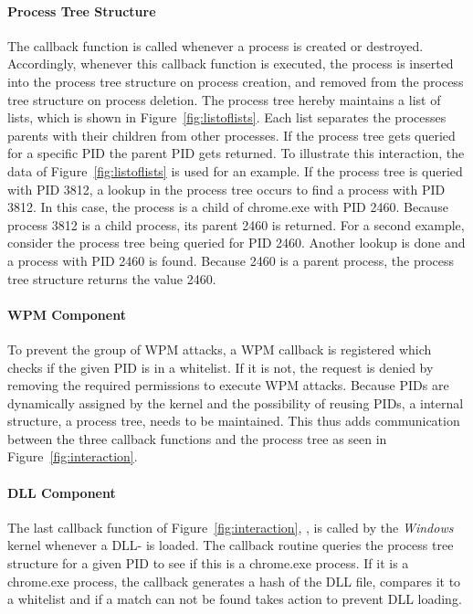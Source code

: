 \paragraph{Process Tree Structure}
The  callback function is called whenever a process is created or destroyed. Accordingly, whenever this callback function is executed, the process is inserted into the process tree structure on process creation, and removed from the process tree structure on process deletion. The process tree hereby maintains a list of lists, which is shown in Figure~\ref{fig:listoflists}.
Each list separates the processes parents with their children from other processes. If the process tree gets queried for a specific \gls{PID} the parent \gls{PID} gets returned. To illustrate this interaction, the data of Figure~\ref{fig:listoflists} is used for an example. If the process tree is queried with \gls{PID} 3812, a lookup in the process tree occurs to find a process with \gls{PID} 3812. In this case, the process is a child of chrome.exe with \gls{PID} 2460.
Because process 3812 is a child process, its parent 2460 is returned. For a second example, consider the process tree being queried for \gls{PID} 2460. Another lookup is done and a process with \gls{PID} 2460 is found. Because 2460 is a parent process, the process tree structure returns the value 2460.

\paragraph{WPM Component}
To prevent the group of \gls{WPM} attacks, a \gls{WPM} callback is registered which checks if the given \gls{PID} is in a whitelist. If it is not, the request is denied by removing the required permissions to execute \gls{WPM} attacks. Because \glspl{PID} are dynamically assigned by the kernel and the possibility of reusing \glspl{PID}, a internal structure, a process tree, needs to be maintained. This thus adds communication between the three callback functions and the process tree as seen in Figure~\ref{fig:interaction}.

\paragraph{DLL Component}
The last callback function of Figure~\ref{fig:interaction}, , is called by the \emph{Windows} kernel whenever a \gls{DLL}- is loaded. The callback routine queries the process tree structure for a given \gls{PID} to see if this is a chrome.exe process. If it is a chrome.exe process, the callback generates a hash of the \gls{DLL} file, compares it to a whitelist and if a match can not be found takes action to prevent \gls{DLL} loading.